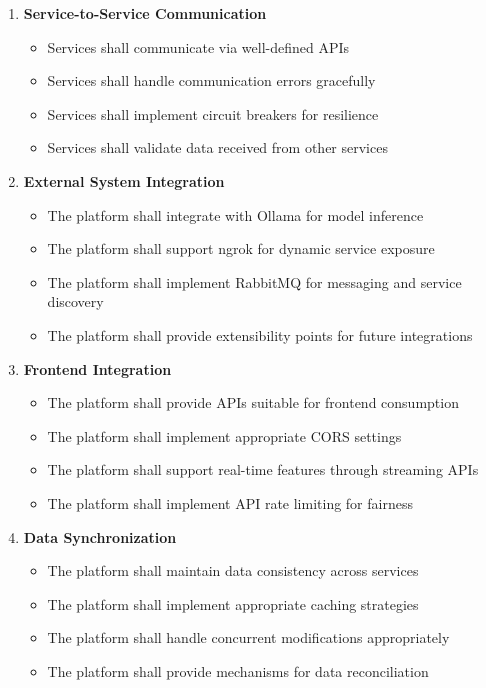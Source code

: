 \begin{enumerate}
   \item \textbf{Service-to-Service Communication}
   \begin{itemize}
      \item Services shall communicate via well-defined APIs
      \item Services shall handle communication errors gracefully
      \item Services shall implement circuit breakers for resilience
      \item Services shall validate data received from other services
   \end{itemize}

   \item \textbf{External System Integration}
   \begin{itemize}
      \item The platform shall integrate with Ollama for model inference
      \item The platform shall support ngrok for dynamic service exposure
      \item The platform shall implement RabbitMQ for messaging and service discovery
      \item The platform shall provide extensibility points for future integrations
   \end{itemize}

   \item \textbf{Frontend Integration}
   \begin{itemize}
      \item The platform shall provide APIs suitable for frontend consumption
      \item The platform shall implement appropriate CORS settings
      \item The platform shall support real-time features through streaming APIs
      \item The platform shall implement API rate limiting for fairness
   \end{itemize}

   \item \textbf{Data Synchronization}
   \begin{itemize}
      \item The platform shall maintain data consistency across services
      \item The platform shall implement appropriate caching strategies
      \item The platform shall handle concurrent modifications appropriately
      \item The platform shall provide mechanisms for data reconciliation
   \end{itemize}
\end{enumerate}

